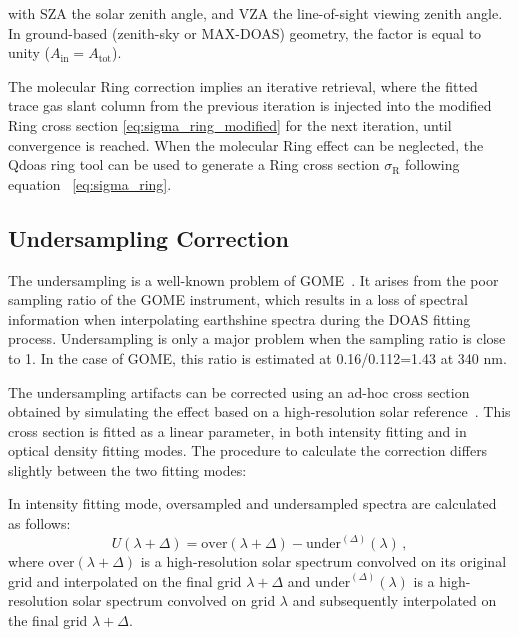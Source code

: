 with SZA the solar zenith angle, and VZA the line-of-sight viewing zenith angle.
In ground-based (zenith-sky or MAX-DOAS) geometry, the factor is equal to unity ($A_\mathrm{in} = A_\mathrm{tot}$).

The molecular Ring correction implies an iterative retrieval, where the fitted
trace gas slant column from the previous iteration is injected
into the modified Ring cross section \eqref{eq:sigma_ring_modified} for the next iteration, until convergence is reached.  When the molecular Ring effect can be neglected, the Qdoas ring tool can be used to generate a Ring cross section $\sigma_\mathrm{R}$
following equation ~\eqref{eq:sigma_ring}.

\subsection{Undersampling Correction}\label{sec:unders-corr}
The undersampling is a well-known problem of
GOME~\citep{Chance1998}. It arises from the poor sampling ratio of the
GOME instrument, which results in a loss of spectral information when
interpolating earthshine spectra during the DOAS fitting
process. Undersampling is only a major problem when the sampling ratio
is close to 1.  In the case of GOME, this ratio is estimated at
0.16/0.112=1.43 at 340 nm.

The undersampling artifacts can be corrected using an ad-hoc cross
section obtained by simulating the effect based on a high-resolution
solar reference~\citep{Chance1998}.  This cross section is fitted as a
linear parameter, in both intensity fitting and in optical density
fitting modes.  The procedure to calculate the correction differs
slightly between the two fitting modes:

In intensity fitting mode, oversampled
and undersampled spectra are calculated as follows:
\begin{equation}
  \label{eq:undersampling}
  U(\lambda+\Delta) = \mathrm{over}(\lambda+\Delta) - \mathrm{under}^{(\Delta)}(\lambda)\,,
\end{equation}
where $\mathrm{over}(\lambda + \Delta)$ is a high-resolution solar
spectrum convolved on its original grid and interpolated on the final
grid $\lambda + \Delta$ and $\mathrm{under}^{(\Delta)}(\lambda)$ is a
high-resolution solar spectrum convolved on grid $\lambda$ and
subsequently interpolated on the final grid $\lambda + \Delta$.

